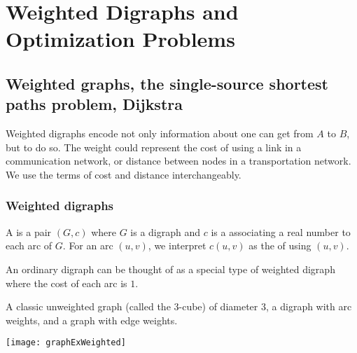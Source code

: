 \part{Weighted Digraphs and Optimization Problems}
\label{ch:weighted}

\chapter{Weighted graphs, the single-source shortest paths problem, Dijkstra} %
Weighted digraphs encode not only information about  one can get from $A$ to $B$,
but  to do so.
The weight could represent the cost of using a link in a communication network, 
or distance between nodes in a transportation network. 
We use the terms of cost and distance interchangeably.


\section{Weighted digraphs} \label{sec:weighted}
\begin{Definition}
A  is a pair $(G, c)$ where $G$ is a digraph
and $c$ is a  associating a real number to each arc of $G$. 
For an arc $(u,v)$, we interpret  $c(u, v)$ as the  of using $(u, v)$.
\end{Definition}

An ordinary digraph can be thought of as a special type of weighted digraph 
where the cost of each arc is $1$. 

\begin{Boxample} \label{ex:graphExWeighted}
A classic unweighted graph (called the $3$-cube) of diameter $3$, a digraph with arc weights, 
and a graph with edge weights.
\begin{center}
 \texttt{[image: graphExWeighted]}
\end{center}
\end{Boxample}

